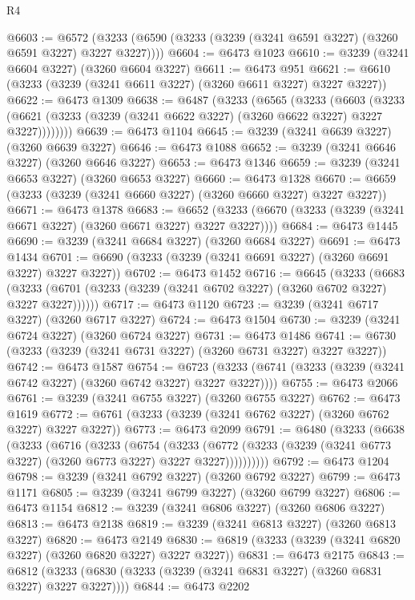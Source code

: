 \begin{lexlean}{R4}
\begin{coremodule}
@6603 := @6572 (@3233 (@6590 (@3233 (@3239 (@3241 @6591 @3227) (@3260 @6591 @3227) @3227 @3227))))
@6604 := @6473 @1023
@6610 := @3239 (@3241 @6604 @3227) (@3260 @6604 @3227)
@6611 := @6473 @951
@6621 := @6610 (@3233 (@3239 (@3241 @6611 @3227) (@3260 @6611 @3227) @3227 @3227))
@6622 := @6473 @1309
@6638 := @6487
    (@3233
      (@6565
        (@3233
          (@6603
            (@3233 (@6621 (@3233 (@3239 (@3241 @6622 @3227) (@3260 @6622 @3227) @3227 @3227))))))))
@6639 := @6473 @1104
@6645 := @3239 (@3241 @6639 @3227) (@3260 @6639 @3227)
@6646 := @6473 @1088
@6652 := @3239 (@3241 @6646 @3227) (@3260 @6646 @3227)
@6653 := @6473 @1346
@6659 := @3239 (@3241 @6653 @3227) (@3260 @6653 @3227)
@6660 := @6473 @1328
@6670 := @6659 (@3233 (@3239 (@3241 @6660 @3227) (@3260 @6660 @3227) @3227 @3227))
@6671 := @6473 @1378
@6683 := @6652 (@3233 (@6670 (@3233 (@3239 (@3241 @6671 @3227) (@3260 @6671 @3227) @3227 @3227))))
@6684 := @6473 @1445
@6690 := @3239 (@3241 @6684 @3227) (@3260 @6684 @3227)
@6691 := @6473 @1434
@6701 := @6690 (@3233 (@3239 (@3241 @6691 @3227) (@3260 @6691 @3227) @3227 @3227))
@6702 := @6473 @1452
@6716 := @6645
    (@3233
      (@6683 (@3233 (@6701 (@3233 (@3239 (@3241 @6702 @3227) (@3260 @6702 @3227) @3227 @3227))))))
@6717 := @6473 @1120
@6723 := @3239 (@3241 @6717 @3227) (@3260 @6717 @3227)
@6724 := @6473 @1504
@6730 := @3239 (@3241 @6724 @3227) (@3260 @6724 @3227)
@6731 := @6473 @1486
@6741 := @6730 (@3233 (@3239 (@3241 @6731 @3227) (@3260 @6731 @3227) @3227 @3227))
@6742 := @6473 @1587
@6754 := @6723 (@3233 (@6741 (@3233 (@3239 (@3241 @6742 @3227) (@3260 @6742 @3227) @3227 @3227))))
@6755 := @6473 @2066
@6761 := @3239 (@3241 @6755 @3227) (@3260 @6755 @3227)
@6762 := @6473 @1619
@6772 := @6761 (@3233 (@3239 (@3241 @6762 @3227) (@3260 @6762 @3227) @3227 @3227))
@6773 := @6473 @2099
@6791 := @6480
    (@3233
      (@6638
        (@3233
          (@6716
            (@3233
              (@6754
                (@3233
                  (@6772 (@3233 (@3239 (@3241 @6773 @3227) (@3260 @6773 @3227) @3227 @3227))))))))))
@6792 := @6473 @1204
@6798 := @3239 (@3241 @6792 @3227) (@3260 @6792 @3227)
@6799 := @6473 @1171
@6805 := @3239 (@3241 @6799 @3227) (@3260 @6799 @3227)
@6806 := @6473 @1154
@6812 := @3239 (@3241 @6806 @3227) (@3260 @6806 @3227)
@6813 := @6473 @2138
@6819 := @3239 (@3241 @6813 @3227) (@3260 @6813 @3227)
@6820 := @6473 @2149
@6830 := @6819 (@3233 (@3239 (@3241 @6820 @3227) (@3260 @6820 @3227) @3227 @3227))
@6831 := @6473 @2175
@6843 := @6812 (@3233 (@6830 (@3233 (@3239 (@3241 @6831 @3227) (@3260 @6831 @3227) @3227 @3227))))
@6844 := @6473 @2202

\end{coremodule}
\end{lexlean}
